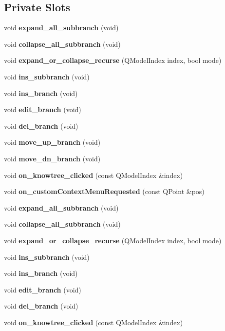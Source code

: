 \subsection*{Private Slots}
\begin{CompactItemize}
\item 
void {\bf expand\_\-all\_\-subbranch} (void)
\item 
void {\bf collapse\_\-all\_\-subbranch} (void)
\item 
void {\bf expand\_\-or\_\-collapse\_\-recurse} (QModel\-Index index, bool mode)
\item 
void {\bf ins\_\-subbranch} (void)
\item 
void {\bf ins\_\-branch} (void)
\item 
void {\bf edit\_\-branch} (void)
\item 
void {\bf del\_\-branch} (void)
\item 
void {\bf move\_\-up\_\-branch} (void)
\item 
void {\bf move\_\-dn\_\-branch} (void)
\item 
void {\bf on\_\-knowtree\_\-clicked} (const QModel\-Index \&index)
\item 
void {\bf on\_\-custom\-Context\-Menu\-Requested} (const QPoint \&pos)
\item 
void {\bf expand\_\-all\_\-subbranch} (void)
\item 
void {\bf collapse\_\-all\_\-subbranch} (void)
\item 
void {\bf expand\_\-or\_\-collapse\_\-recurse} (QModel\-Index index, bool mode)
\item 
void {\bf ins\_\-subbranch} (void)
\item 
void {\bf ins\_\-branch} (void)
\item 
void {\bf edit\_\-branch} (void)
\item 
void {\bf del\_\-branch} (void)
\item 
void {\bf on\_\-knowtree\_\-clicked} (const QModel\-Index \&index)
\end{CompactItemize}
